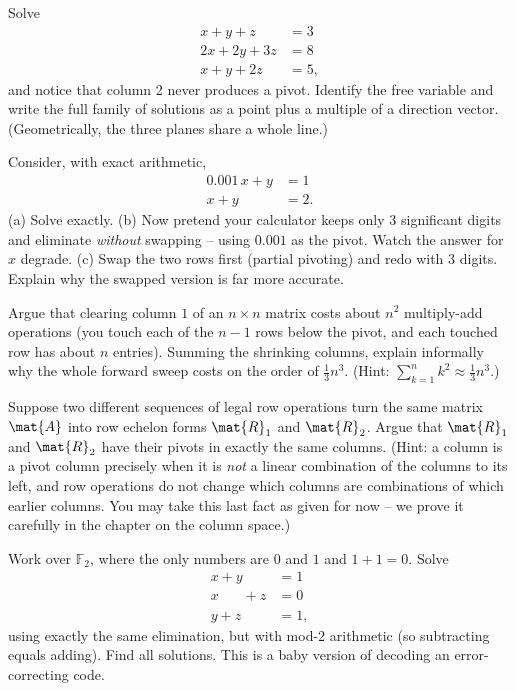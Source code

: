 \begin{exercise}
Solve
\[
\begin{aligned}
x + y + z &= 3\\
2x + 2y + 3z &= 8\\
x + y + 2z &= 5,
\end{aligned}
\]
and notice that column 2 never produces a pivot. Identify the free variable and
write the full family of solutions as a point plus a multiple of a direction
vector. (Geometrically, the three planes share a whole line.)
\end{exercise}

\begin{exercise}
Consider, with exact arithmetic,
\[
\begin{aligned}
0.001\,x + y &= 1\\
x + y &= 2.
\end{aligned}
\]
(a) Solve exactly. (b) Now pretend your calculator keeps only $3$ significant
digits and eliminate \emph{without} swapping -- using $0.001$ as the pivot.
Watch the answer for $x$ degrade. (c) Swap the two rows first (partial pivoting)
and redo with $3$ digits. Explain why the swapped version is far more accurate.
\end{exercise}

\begin{exercise}
Argue that clearing column $1$ of an $n\times n$ matrix costs about $n^2$
multiply-add operations (you touch each of the $n-1$ rows below the pivot, and
each touched row has about $n$ entries). Summing the shrinking columns, explain
informally why the whole forward sweep costs on the order of $\tfrac13 n^3$.
(Hint: $\sum_{k=1}^{n} k^2 \approx \tfrac13 n^3$.)
\end{exercise}

\begin{exercise}
Suppose two different sequences of legal row operations turn the same matrix
$\mat{A}$ into row echelon forms $\mat{R}_1$ and $\mat{R}_2$. Argue that
$\mat{R}_1$ and $\mat{R}_2$ have their pivots in exactly the same columns.
(Hint: a column is a pivot column precisely when it is \emph{not} a linear
combination of the columns to its left, and row operations do not change which
columns are combinations of which earlier columns. You may take this last fact
as given for now -- we prove it carefully in the chapter on the column space.)
\end{exercise}

\begin{exercise}
Work over $\mathbb{F}_2$, where the only numbers are $0$ and $1$ and $1+1=0$.
Solve
\[
\begin{aligned}
x + y \phantom{{}+ z} &= 1\\
x \phantom{{}+ y} + z &= 0\\
y + z &= 1,
\end{aligned}
\]
using exactly the same elimination, but with mod-$2$ arithmetic (so subtracting
equals adding). Find all solutions. This is a baby version of decoding an
error-correcting code.
\end{exercise}
